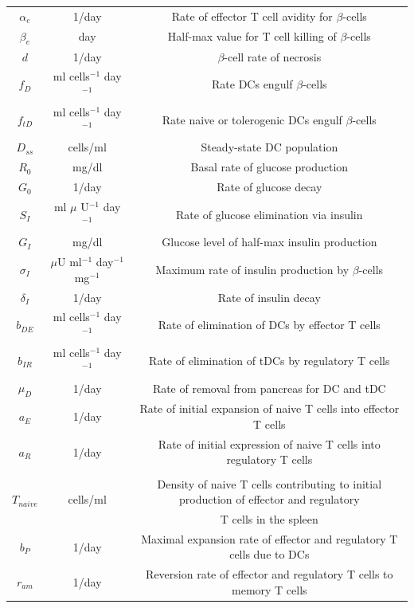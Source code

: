 \begin{appendices}
\begin{table}[H]
\begin{tabular}{c|c|c}
            $\alpha_e$ & 1/day & Rate of effector T cell avidity for $\beta$-cells\\
            $\beta_e$ & day & Half-max value for T cell killing of $\beta$-cells\\
            $d$ & 1/day & $\beta$-cell rate of necrosis\\
            $f_D$ & ml cells$^{-1}$ day$^{-1}$ & Rate DCs engulf $\beta$-cells\\
            $f_{tD}$ & ml cells$^{-1}$ day$^{-1}$ & Rate naive or tolerogenic DCs engulf $\beta$-cells\\
            $D_{ss}$ & cells/ml & Steady-state DC population\\
            $R_0$ & mg/dl & Basal rate of glucose production\\
            $G_0$ & 1/day & Rate of glucose decay\\
            $S_I$ & ml $\mu$ U$^{-1}$ day$^{-1}$ & Rate of glucose elimination via insulin\\
            $G_I$ & mg/dl & Glucose level of half-max insulin production\\
            $\sigma_I$ & $\mu$U ml$^{-1}$ day$^{-1}$ mg$^{-1}$& Maximum rate of insulin production by $\beta$-cells\\
            $\delta_I$ & 1/day & Rate of insulin decay\\
            $b_{DE}$ & ml cells$^{-1}$ day$^{-1}$ & Rate of elimination of DCs by effector T cells\\
            $b_{IR}$ & ml cells$^{-1}$ day$^{-1}$ & Rate of elimination of tDCs by regulatory T cells\\
            $\mu_D$ & 1/day & Rate of removal from pancreas for DC and tDC\\
            $a_E$ & 1/day & Rate of initial expansion of naive T cells into effector T cells\\
            $a_R$ & 1/day & Rate of initial expression of naive T cells into regulatory T cells\\
            \multirow{3}{*}{$T_{naive}$} & \multirow{3}{*}{cells/ml} &  \\
            & & Density of naive T cells contributing to initial production of effector and regulatory\\
            & & T cells in the spleen\\
            $b_P$ & 1/day & Maximal expansion rate of effector and regulatory T cells due to DCs\\
            $r_{am}$ & 1/day & Reversion rate of effector and regulatory T cells to memory T cells\\

\end{tabular}
\end{table}
\end{appendices}
